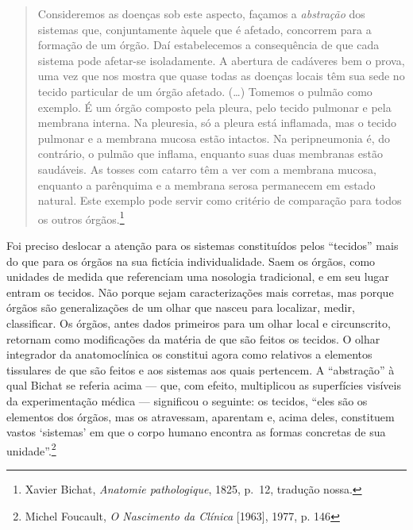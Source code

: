 \begin{quote}
Consideremos as doenças sob este aspecto, façamos a \textit{abstração} dos
sistemas que, conjuntamente àquele que é afetado, concorrem para a
formação de um órgão. Daí estabelecemos a consequência de que cada
sistema pode afetar-se isoladamente. A abertura de cadáveres bem o
prova, uma vez que nos mostra que quase todas as doenças locais têm sua
sede no tecido particular de um órgão afetado. (\ldots{}) Tomemos o
pulmão como exemplo. É um órgão composto pela pleura, pelo tecido
pulmonar e pela membrana interna. Na pleuresia, só a pleura está
inflamada, mas o tecido pulmonar e a membrana mucosa estão intactos. Na
peripneumonia é, do contrário, o pulmão que inflama, enquanto suas duas
membranas estão saudáveis. As tosses com catarro têm a ver com a
membrana mucosa, enquanto a parênquima e a membrana serosa permanecem em
estado natural. Este exemplo pode servir como critério de comparação
para todos os outros órgãos.\footnote{Xavier Bichat, \textit{Anatomie
  pathologique}, 1825, p.~12, tradução nossa.}
\end{quote}

Foi preciso deslocar a atenção para os sistemas constituídos pelos
``tecidos'' mais do que para os órgãos na sua fictícia individualidade.
Saem os órgãos, como unidades de medida que referenciam uma nosologia
tradicional, e em seu lugar entram os tecidos. Não porque sejam
caracterizações mais corretas, mas porque órgãos são generalizações de
um olhar que nasceu para localizar, medir, classificar. Os órgãos, antes
dados primeiros para um olhar local e circunscrito, retornam como
modificações da matéria de que são feitos os tecidos. O olhar integrador
da anatomoclínica os constitui agora como relativos a elementos
tissulares de que são feitos e aos sistemas aos quais pertencem. A
``abstração'' à qual Bichat se referia acima --- que, com efeito,
multiplicou as superfícies visíveis da experimentação médica ---
significou o seguinte: os tecidos, ``eles são os elementos dos órgãos,
mas os atravessam, aparentam e, acima deles, constituem vastos
`sistemas' em que o corpo humano encontra as formas concretas de sua
unidade''.\footnote{Michel Foucault, \textit{O Nascimento da Clínica}
  {[}1963{]}, 1977, p. 146}

